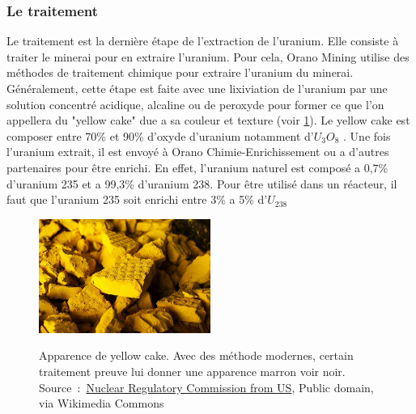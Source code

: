 \subsubsection{Le traitement}
Le traitement est la dernière étape de l'extraction de l'uranium. Elle consiste à traiter le minerai pour en extraire l'uranium. Pour cela, Orano Mining utilise des méthodes de traitement chimique pour extraire l'uranium du minerai. Généralement, cette étape est faite avec une lixiviation de l'uranium par une solution concentré acidique, alcaline ou de peroxyde pour former ce que l'on appellera du "yellow cake" due a sa couleur et texture (voir \cref{fig_yellow-cake}). Le yellow cake est composer entre 70\% et 90\% d'oxyde d'uranium notamment d'$U_3O_8$ \cite{article:composition-yellow-cake}. Une fois l'uranium extrait, il est envoyé à Orano Chimie-Enrichissement ou a d'autres partenaires pour être enrichi. En effet, l'uranium naturel est composé a 0,7\% d'uranium 235 et a 99,3\% d'uranium 238\cite{}. Pour être utilisé dans un réacteur, il faut que l'uranium 235 soit enrichi entre 3\% a 5\% d'$U_{238}$\cite{article:uranium-concentration}

\begin{figure}
\centering
\href{https://commons.wikimedia.org/wiki/File:Yellow_Cake_Uranium_(14492248719).jpg}{\includegraphics[width=0.5\textwidth]{img/Yellow_Cake_Uranium_(14492248719).jpg}}
\caption[Apparence du yellow cake]{Apparence de yellow cake. Avec des méthode modernes, certain traitement preuve lui donner une apparence marron voir noir. Source~:~\href{https://commons.wikimedia.org/wiki/File:Yellow_Cake_Uranium_(14492248719).jpg}{Nuclear Regulatory Commission from US}, Public domain, via Wikimedia Commons}
\label{fig_yellow-cake}
\end{figure}

